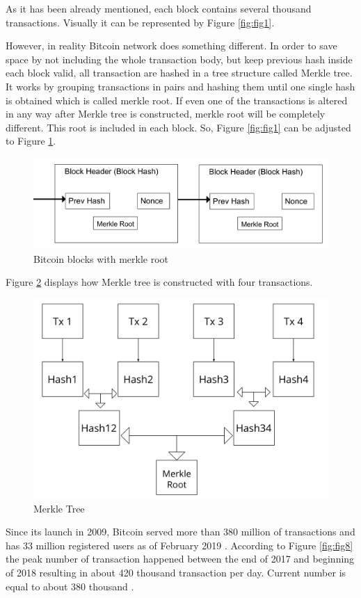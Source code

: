 \documentclass[conference,compsoc]{IEEEtran}
\begin{document}
As it has been already mentioned, each block contains several thousand transactions. 
Visually it can be represented by Figure \ref{fig:fig1}. 

However, in reality Bitcoin network does something different. 
In order to save space by not including the whole transaction body, but keep previous hash inside each block valid, all transaction are hashed in a tree structure called Merkle tree.
It works by grouping transactions in pairs and hashing them until one single hash is obtained which is called merkle root. 
If even one of the transactions is altered in any way after Merkle tree is constructed, merkle root will be completely different. 
This root is included in each block.
So, Figure \ref{fig:fig1} can be adjusted to Figure \ref{fig:fig6}.

\begin{figure}[h]
  \centering
  \includegraphics[width=.45\textwidth]{graphics/blocks_merkle.png}
  \caption{Bitcoin blocks with merkle root}
  \label{fig:fig6}
\end{figure}

Figure \ref{fig:fig7} displays how Merkle tree is constructed with four transactions.

\begin{figure}[h!]
  \centering
  \includegraphics[width=.45\textwidth]{graphics/merkle.png}
  \caption{Merkle Tree}
  \label{fig:fig7}
\end{figure}

Since its launch in 2009, Bitcoin served more than 380 million of transactions and has 33 million registered users as of February 2019 \cite{blockchain}. According to Figure \ref{fig:fig8} the peak number of transaction happened between the end of 2017 and beginning of 2018 resulting in about 420 thousand transaction per day. Current number is equal to about 380 thousand \cite{blockchain}. 
\end{document}
